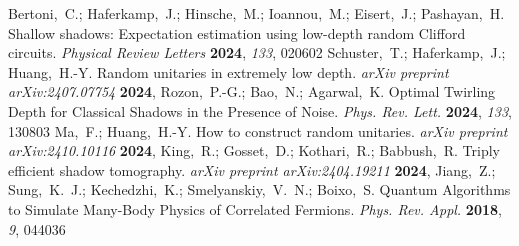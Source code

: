 \documentclass[journal=jctcce,a4paper,manuscript=article]{achemso}
\begin{document}
\begin{mcitethebibliography}{41}
  \mciteBstWouldAddEndPuncttrue
  \mciteSetBstMidEndSepPunct{\mcitedefaultmidpunct}
  {\mcitedefaultendpunct}{\mcitedefaultseppunct}\relax
  \EndOfBibitem
  Bertoni,~C.; Haferkamp,~J.; Hinsche,~M.; Ioannou,~M.; Eisert,~J.; Pashayan,~H. Shallow shadows: Expectation estimation using low-depth random Clifford circuits. \emph{Physical Review Letters} \textbf{2024}, \emph{133}, 020602\relax
  \mciteBstWouldAddEndPuncttrue
  \mciteSetBstMidEndSepPunct{\mcitedefaultmidpunct}
  {\mcitedefaultendpunct}{\mcitedefaultseppunct}\relax
  \EndOfBibitem
  Schuster,~T.; Haferkamp,~J.; Huang,~H.-Y. Random unitaries in extremely low depth. \emph{arXiv preprint arXiv:2407.07754} \textbf{2024}, \relax
  \mciteBstWouldAddEndPunctfalse
  \mciteSetBstMidEndSepPunct{\mcitedefaultmidpunct}
  {}{\mcitedefaultseppunct}\relax
  \EndOfBibitem
  Rozon,~P.-G.; Bao,~N.; Agarwal,~K. Optimal Twirling Depth for Classical Shadows in the Presence of Noise. \emph{Phys. Rev. Lett.} \textbf{2024}, \emph{133}, 130803\relax
  \mciteBstWouldAddEndPuncttrue
  \mciteSetBstMidEndSepPunct{\mcitedefaultmidpunct}
  {\mcitedefaultendpunct}{\mcitedefaultseppunct}\relax
  \EndOfBibitem
  Ma,~F.; Huang,~H.-Y. How to construct random unitaries. \emph{arXiv preprint arXiv:2410.10116} \textbf{2024}, \relax
  \mciteBstWouldAddEndPunctfalse
  \mciteSetBstMidEndSepPunct{\mcitedefaultmidpunct}
  {}{\mcitedefaultseppunct}\relax
  \EndOfBibitem
  King,~R.; Gosset,~D.; Kothari,~R.; Babbush,~R. Triply efficient shadow tomography. \emph{arXiv preprint arXiv:2404.19211} \textbf{2024}, \relax
  \mciteBstWouldAddEndPunctfalse
  \mciteSetBstMidEndSepPunct{\mcitedefaultmidpunct}
  {}{\mcitedefaultseppunct}\relax
  \EndOfBibitem
  Jiang,~Z.; Sung,~K.~J.; Kechedzhi,~K.; Smelyanskiy,~V.~N.; Boixo,~S. Quantum Algorithms to Simulate Many-Body Physics of Correlated Fermions. \emph{Phys. Rev. Appl.} \textbf{2018}, \emph{9}, 044036\relax
  \mciteBstWouldAddEndPuncttrue
  \mciteSetBstMidEndSepPunct{\mcitedefaultmidpunct}
  {\mcitedefaultendpunct}{\mcitedefaultseppunct}\relax
  \EndOfBibitem

\end{mcitethebibliography}
\end{document}
